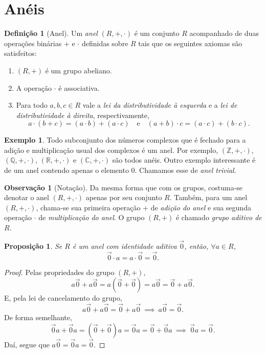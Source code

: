 \documentclass[a4paper,12pt]{report}
\theoremstyle{plain}
\newtheorem{proposicao}{Proposição}[section]
\theoremstyle{definition}
\newtheorem{definicao}{Definição}[section]
\newtheorem{observacao}{Observação}[section]
\newtheorem{exemplo}{Exemplo}[section]
\begin{document}



\section{Anéis}

\begin{definicao}[Anel]
	Um \emph{anel} $(R, +, \cdot)$ é um conjunto $R$ acompanhado de duas operações binárias $+$ e $\cdot$ definidas sobre $R$ tais que os seguintes axiomas são satisfeitos:
	\begin{enumerate}
		\item $(R, +)$ é um grupo abeliano.
		\item A operação $\cdot$ é associativa.
		\item Para todo $a,b,c\in R$ vale a \emph{lei da distributividade à esquerda} e a \emph{lei de distributividade à direita}, respectivamente, $$a\cdot(b+c) = (a\cdot b) + (a\cdot c)\quad \text{e} \quad (a+b)\cdot c = (a\cdot c) + (b\cdot c).$$
	\end{enumerate}
\end{definicao}

\begin{exemplo}
	Todo subconjunto dos números complexos que é fechado para a adição e multiplicação usual dos complexos é um anel. Por exemplo, $(\mathbb{Z}, +, \cdot)$, $(\mathbb{Q}, +, \cdot)$, $(\mathbb{R}, +, \cdot)$ e $(\mathbb{C}, +, \cdot)$ são todos anéis.
	Outro exemplo interessante é de um anel contendo apenas o elemento $0$. Chamamos esse de \emph{anel trivial}.
\end{exemplo}

\begin{observacao}[Notação]
	Da mesma forma que com os grupos, costuma-se denotar o anel $(R, +, \cdot)$ apenas por seu conjunto $R$. Também, para um anel $(R, +, \cdot)$, chama-se sua primeira operação $+$ de \emph{adição do anel} e sua segunda operação $\cdot$ de \emph{multiplicação do anel}. O grupo $(R,+)$ é chamado \emph{grupo aditivo de $R$}.
\end{observacao}

\begin{proposicao}
	Se $R$ é um anel com identidade aditiva $\vec 0$, então, $\forall a \in R$, $$\vec 0 \cdot a = a \cdot \vec 0 = \vec 0.$$
\end{proposicao}
\begin{proof}
	Pelas propriedades do grupo $(R, +)$, $$a\vec 0 + a\vec 0 = a(\vec 0 + \vec 0) = a\vec 0 = \vec 0 + a\vec 0.$$ E, pela lei de cancelamento do grupo, $$a\vec0 + a\vec 0 = \vec 0 + a\vec 0 \ \implies \ a\vec 0 = \vec 0.$$
	De forma semelhante, $$\vec 0a + \vec 0a = (\vec 0 + \vec 0)a = \vec 0a = \vec 0 + \vec 0a \ \implies \ \vec 0a = \vec 0.$$ Daí, segue que $a\vec 0 = \vec 0a = \vec 0$. 
\end{proof}
\end{document}
